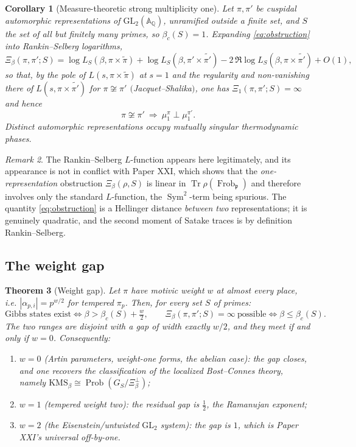 \documentclass[11pt]{amsart}
\numberwithin{equation}{section}
\newtheorem{theorem}{Theorem}[section]
\newtheorem{corollary}[theorem]{Corollary}
\theoremstyle{definition}
\theoremstyle{remark}
\newtheorem{remark}[theorem]{Remark}
\newcommand{\Q}{\mathbb{Q}}
\newcommand{\A}{\mathbb{A}}
\newcommand{\pp}{\mathfrak{p}}
\newcommand{\Frob}{\operatorname{Frob}}
\newcommand{\Prob}{\operatorname{Prob}}
\newcommand{\KMS}{\mathrm{KMS}}
\newcommand{\GL}{\mathrm{GL}}
\newcommand{\Sym}{\operatorname{Sym}}
\newcommand{\Tr}{\operatorname{Tr}}
\begin{document}
\begin{corollary}[Measure-theoretic strong multiplicity one]\label{cor:multone}
Let $\pi,\pi'$ be cuspidal automorphic representations of $\GL_2(\A_\Q)$, unramified
outside a finite set, and $S$ the set of all but finitely many primes, so
$\beta_c(S)=1$. Expanding \eqref{eq:obstruction} into Rankin--Selberg logarithms,
\[
\Xi_\beta(\pi,\pi';S)=\log L_S(\beta,\pi\times\widetilde\pi)
+\log L_S(\beta,\pi'\times\widetilde{\pi'})
-2\,\Re\log L_S(\beta,\pi\times\widetilde{\pi'})+O(1),
\]
so that, by the pole of $L(s,\pi\times\widetilde\pi)$ at $s=1$ and the regularity and
non-vanishing there of $L(s,\pi\times\widetilde{\pi'})$ for $\pi\not\cong\pi'$
$($Jacquet--Shalika$)$, one has $\Xi_1(\pi,\pi';S)=\infty$ and hence
\[
\pi\not\cong\pi'\ \Longrightarrow\ \mu^\pi_1\perp\mu^{\pi'}_1 .
\]
Distinct automorphic representations occupy mutually singular thermodynamic phases.
\end{corollary}

\begin{remark}
The Rankin--Selberg $L$-function appears here legitimately, and its appearance is not in
conflict with Paper XXI, which shows that the \emph{one-representation} obstruction
$\Xi_\beta(\rho,S)$ is linear in $\Tr\rho(\Frob_\pp)$ and therefore involves only the
standard $L$-function, the $\Sym^2$-term being spurious. The quantity
\eqref{eq:obstruction} is a Hellinger distance \emph{between two} representations; it is
genuinely quadratic, and the second moment of Satake traces is by definition
Rankin--Selberg.
\end{remark}

\subsection{The weight gap}

\begin{theorem}[Weight gap]\label{thm:gap}
Let $\pi$ have motivic weight $w$ at almost every place, i.e.
$|\alpha_{p,i}|=p^{w/2}$ for tempered $\pi_p$. Then, for every set $S$ of primes:
\[
\text{Gibbs states exist}\iff\beta>\beta_c(S)+\tfrac{w}{2},
\qquad
\Xi_\beta(\pi,\pi';S)=\infty\ \text{possible}\iff\beta\le\beta_c(S).
\]
The two ranges are disjoint with a gap of width exactly $w/2$, and they meet if and only
if $w=0$. Consequently:
\begin{enumerate}
\item[(i)] $w=0$ (Artin parameters, weight-one forms, the abelian case): the gap
closes, and one recovers the classification of the localized Bost--Connes theory,
namely $\KMS_\beta\cong\Prob(G_S/\Xi_\beta^\perp)$;
\item[(ii)] $w=1$ (tempered weight two): the residual gap is $\tfrac12$, the Ramanujan
exponent;
\item[(iii)] $w=2$ (the Eisenstein/untwisted $\GL_2$ system): the gap is $1$, which is
Paper XXI's universal off-by-one.
\end{enumerate}
\end{theorem}
\end{document}
